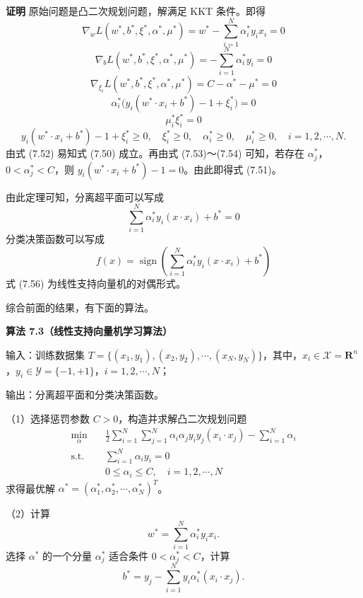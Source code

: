 \documentclass[UTF8,12pt,a4paper,fontset=fandol]{ctexart}
\begin{document}
\noindent\textbf{证明}\quad
原始问题是凸二次规划问题，解满足 KKT 条件。即得
\begin{equation}
\nabla_w L(w^*,b^*,\xi^*,\alpha^*,\mu^*)=w^*-\sum_{i=1}^N\alpha_i^*y_i x_i=0
\tag{7.52}
\end{equation}
\[
\nabla_b L(w^*,b^*,\xi^*,\alpha^*,\mu^*)=-\sum_{i=1}^N\alpha_i^*y_i=0
\]
\[
\nabla_{\xi_i} L(w^*,b^*,\xi^*,\alpha^*,\mu^*)=C-\alpha^*-\mu^*=0
\]
\begin{equation}
\alpha_i^*\bigl(y_i(w^*\cdot x_i+b^*)-1+\xi_i^*\bigr)=0
\tag{7.53}
\end{equation}
\begin{equation}
\mu_i^*\xi_i^*=0
\tag{7.54}
\end{equation}
\[
y_i(w^*\cdot x_i+b^*)-1+\xi_i^*\geq 0,\quad
\xi_i^*\geq 0,\quad
\alpha_i^*\geq 0,\quad
\mu_i^*\geq 0,\quad i=1,2,\cdots,N.
\]
由式 (7.52) 易知式 (7.50) 成立。再由式 (7.53)～(7.54) 可知，若存在 $\alpha_j^*$，$0<\alpha_j^*<C$，则 $y_i(w^*\cdot x_i+b^*)-1=0$。由此即得式 (7.51)。

由此定理可知，分离超平面可以写成
\begin{equation}
\sum_{i=1}^N\alpha_i^*y_i(x\cdot x_i)+b^*=0
\tag{7.55}
\end{equation}
分类决策函数可以写成
\begin{equation}
f(x)=\operatorname{sign}\left(\sum_{i=1}^N\alpha_i^*y_i(x\cdot x_i)+b^*\right)
\tag{7.56}
\end{equation}
式 (7.56) 为线性支持向量机的对偶形式。

综合前面的结果，有下面的算法。

\noindent\textbf{算法 7.3（线性支持向量机学习算法）}

输入：训练数据集 $T=\{(x_1,y_1),(x_2,y_2),\cdots,(x_N,y_N)\}$，其中，$x_i\in\mathcal{X}=\mathbf{R}^n$，$y_i\in\mathcal{Y}=\{-1,+1\}$，$i=1,2,\cdots,N$；

输出：分离超平面和分类决策函数。

（1）选择惩罚参数 $C>0$，构造并求解凸二次规划问题
\[
\begin{aligned}
\min_\alpha\quad & \frac{1}{2}\sum_{i=1}^N\sum_{j=1}^N\alpha_i\alpha_j y_i y_j(x_i\cdot x_j)-\sum_{i=1}^N\alpha_i\\
\mathrm{s.t.}\quad & \sum_{i=1}^N\alpha_i y_i=0\\
& 0\leq \alpha_i\leq C,\quad i=1,2,\cdots,N
\end{aligned}
\]
求得最优解 $\alpha^*=(\alpha_1^*,\alpha_2^*,\cdots,\alpha_N^*)^T$。

（2）计算
\[
w^*=\sum_{i=1}^N\alpha_i^*y_i x_i.
\]
选择 $\alpha^*$ 的一个分量 $\alpha_j^*$ 适合条件 $0<\alpha_j^*<C$，计算
\[
b^*=y_j-\sum_{i=1}^N y_i\alpha_i^*(x_i\cdot x_j).
\]
\end{document}
